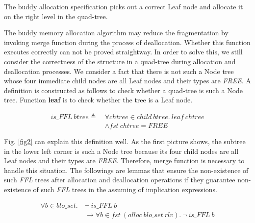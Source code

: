 \begin{theorem}
The buddy allocation specification picks out a correct Leaf node and allocate it on the right level in the quad-tree.
\end{theorem}

The buddy memory allocation algorithm may reduce the fragmentation by invoking merge function during the process of deallocation. Whether this function executes correctly can not be proved straightway. In order to solve this, we still consider the correctness of the structure in a quad-tree during allocation and deallocation processes. We consider a fact that there is not such a Node tree whose four immediate child nodes are all Leaf nodes and their types are \emph{FREE}. A definition is constructed as follows to check whether a quad-tree is such a Node tree. Function \textbf{leaf} is to check whether the tree is a Leaf node.

\begin{definition} 
\end{definition}
\vspace{-7pt}
{\footnotesize
\begin{align*}
is\_FFL\ btree \triangleq\ &\forall chtree \in child\ btree.\ leaf\ chtree \\
&\wedge fst\ chtree = FREE
\end{align*}
}
\vspace{-12pt}

Fig. \ref{fig2} can explain this definition well. As the first picture shows, the subtree in the lower left corner is such a Node tree because its four child nodes are all Leaf nodes and their types are \emph{FREE}. Therefore, merge function is necessary to handle this situation. The followings are lemmas that ensure the non-existence of such \emph{FFL} trees after allocation and deallocation operations if they guarantee non-existence of such \emph{FFL} trees in the assuming of implication expressions.

\begin{lemma} 
\label{allocffl}
\end{lemma}
\vspace{-7pt}
{\footnotesize
\begin{align*}
\forall b \in blo\_set.\ &\neg\ is\_FFL\ b \\
&\longrightarrow \forall b \in fst\ (alloc\ blo\_set\ rlv).\ \neg\ is\_FFL\ b
\end{align*}
}
\vspace{-12pt}

